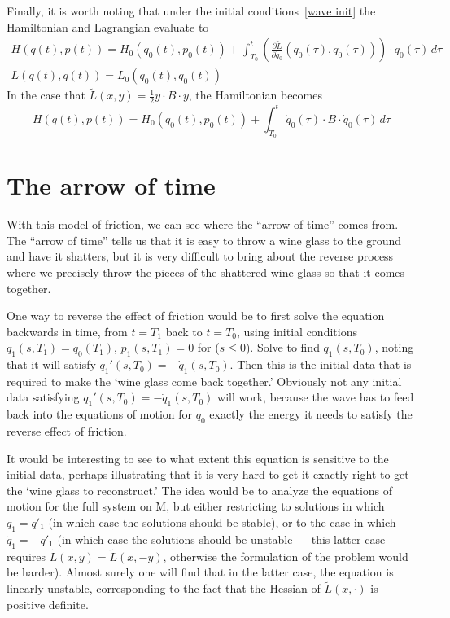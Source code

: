\documentclass{amsart}
\begin{document}
Finally, it is worth noting that under the initial conditions~\eqref{wave init} the Hamiltonian and Lagrangian evaluate to
\begin{gather}
H(q(t),p(t)) = H_0(q_0(t),p_0(t)) + \int_{T_0}^t \left(\frac{\partial \tilde L}{\partial \dot q_0}(q_0(\tau),\dot q_0(\tau))\right)\cdot \dot q_0(\tau) \, d\tau \\
L(q(t),\dot q(t)) = L_0(q_0(t),\dot q_0(t))
\end{gather}
In the case that $\tilde L(x,y) = \tfrac12 y \cdot B \cdot y$, the Hamiltonian becomes
\begin{equation}
H(q(t),p(t)) = H_0(q_0(t),p_0(t)) + \int_{T_0}^t \dot q_0(\tau) \cdot B \cdot \dot q_0(\tau) \, d\tau
\end{equation}

\section{The arrow of time}

With this model of friction, we can see where the ``arrow of time'' comes from.  The ``arrow of time'' tells us that it is easy to throw a wine glass to the ground and have it shatters, but it is very difficult to bring about the reverse process where we precisely throw the pieces of the shattered wine glass so that it comes together.

One way to reverse the effect of friction would be to first solve the equation backwards in time, from $t=T_1$ back to $t=T_0$, using initial conditions $q_1(s,T_1) = q_0(T_1)$, $p_1(s,T_1) = 0$ for ($s \le 0$).  Solve to find $q_1(s,T_0)$, noting that it will satisfy $q_1'(s,T_0) = - \dot q_1(s,T_0)$.  Then this is the initial data that is required to make the `wine glass come back together.'  Obviously not any initial data satisfying $q_1'(s,T_0) = - \dot q_1(s,T_0)$ will work, because the wave has to feed back into the equations of motion for $q_0$ exactly the energy it needs to satisfy the reverse effect of friction.

It would be interesting to see to what extent this equation is sensitive to the initial data, perhaps illustrating that it is very hard to get it exactly right to get the `wine glass to reconstruct.'  The idea would be to analyze the equations of motion for the full system on M, but either restricting to solutions in which $\dot q_1 = q'_1$ (in which case the solutions should be stable), or to the case in which $\dot q_1 = -q'_1$ (in which case the solutions should be unstable --- this latter case requires $\tilde L(x,y) = \tilde L(x,-y)$, otherwise the formulation of the problem would be harder).  Almost surely one will find that in the latter case, the equation is linearly unstable, corresponding to the fact that the Hessian of $\tilde L(x,\cdot)$ is positive definite.
\end{document}
